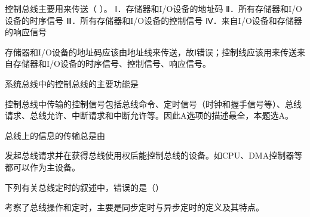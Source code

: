 \question 控制总线主要用来传送（ ）。 Ⅰ．存储器和I/O设备的地址码
Ⅱ．所有存储器和I/O设备的时序信号 Ⅲ．所有存储器和I/O设备的控制信号
Ⅳ．来自I/O设备和存储器的响应信号
\par{}
\begin{solution}存储器和I/O设备的地址码应该由地址线来传送，故Ⅰ错误；控制线应该用来传送来自存储器和I/O设备的时序信号、控制信号、响应信号。
\end{solution}
\question 系统总线中的控制总线的主要功能是
\par{}
\begin{solution}控制总线中传输的控制信号包括总线命令、定时信号（时钟和握手信号等）、总线请求、总线允许、中断请求和中断允许等。因此A选项的描述最全，本题选A。
\end{solution}
\question 总线上的信息的传输总是由
\par{}
\begin{solution}发起总线请求并在获得总线使用权后能控制总线的设备。如CPU、DMA控制器等都可以作为主设备。
\end{solution}
\question 下列有关总线定时的叙述中，错误的是（）
\par{}
\begin{solution}考察了总线操作和定时，主要是同步定时与异步定时的定义及其特点。
\end{solution}
